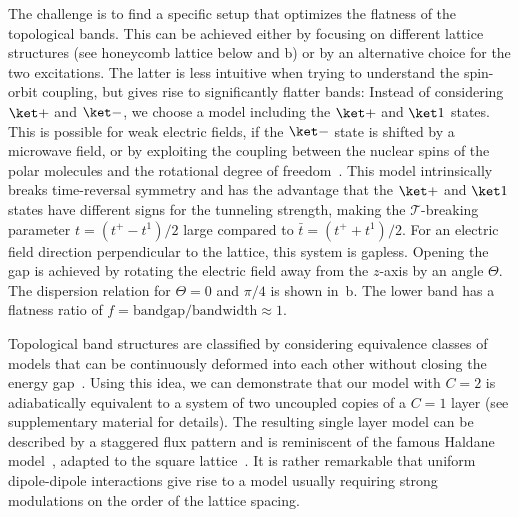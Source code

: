 The challenge is to find a specific setup that optimizes the flatness of the topological bands.
This can be achieved either by focusing on different lattice structures (see honeycomb lattice below and b) or by an alternative choice for the two excitations.
The latter is less intuitive when trying to understand the spin-orbit coupling, but gives rise to significantly flatter bands: Instead of considering $\ketp$ and $\ketm$, we choose a model including the $\ketp$ and $\keto$ states.
This is possible for weak electric fields, if the $\ketm$ state is shifted by a microwave field, or by exploiting the coupling between the nuclear spins of the polar molecules and the rotational degree of freedom~\cite{Ospelkaus2010,Yan2013}.
This model intrinsically breaks time-reversal symmetry and has the advantage that the $\ketp$ and $\keto$ states have different signs for the tunneling strength, making the $\mathcal{T}$-breaking parameter $t=(t^+-t^1)/2$ large compared to $\bar{t}=(t^++t^1)/2$. %
For an electric field direction perpendicular to the lattice, this system is gapless.
Opening the gap is achieved by rotating the electric field away from the $z$-axis by an angle $\Theta$.
The dispersion relation for $\Theta=0$ and $\pi/4$ is shown in~b.
The lower band has a flatness ratio of $f = \text{bandgap}/\text{bandwidth} \approx 1$.


Topological band structures are classified by considering equivalence classes of models that can be continuously deformed into each other without closing the energy gap~\cite{Hasan2010}.
Using this idea, we can demonstrate that our model with $C=2$ is adiabatically equivalent to a system of two uncoupled copies of a $C=1$ layer (see supplementary material for details).
The resulting single layer model can be described by a staggered flux pattern and is reminiscent of the famous Haldane model~\cite{Haldane1988}, adapted to the square lattice~\cite{Goldman2013,Li2008,Liu2010,Liu2011,Stanescu2010,Wang2011,Wang2014,Yao2012,Yao2013}.
It is rather remarkable that uniform dipole-dipole interactions give rise to a model usually requiring strong modulations on the order of the lattice spacing.



